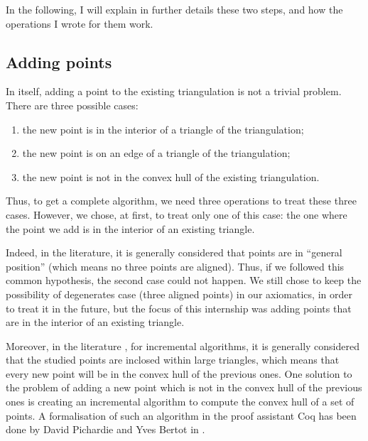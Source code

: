 \documentclass[a4paper,10pt]{article}
\begin{document}
In the following, I will explain in further details these two steps, and how the operations I wrote for them work.
\subsection{Adding points}
\label{step1}

In itself, adding a point to the existing triangulation is not a trivial problem.
There are three possible cases:
\begin{enumerate}
\item the new point is in the interior of a triangle of the triangulation;
\item the new point is on an edge of a triangle of the triangulation;
\item the new point is not in the convex hull of the existing triangulation.
\end{enumerate}
Thus, to get a complete algorithm, we need three operations to treat these three cases. However, we chose, at first, to treat only one of this case: the one where the point we add is in the interior of an existing triangle.

Indeed, in the literature, it is generally considered that points are in ``general position'' (which means no three points are aligned). Thus, if we followed this common hypothesis, the second case could not happen.
We still chose to keep the possibility of degenerates case (three aligned points) in our axiomatics, in order to treat it in the future, but the focus of this internship was adding points that are in the interior of an existing triangle.

Moreover, in the literature \cite{Del}, for incremental algorithms, it is generally considered that the studied points are inclosed within large triangles, which means that every new point will be in the convex hull of the previous ones. One solution to the problem of adding a new point which is not in the convex hull of the previous ones is creating an incremental algorithm to compute the convex hull of a set of points. A formalisation of such an algorithm in the proof assistant {\sc Coq} has been done by David Pichardie and Yves Bertot in \cite{Hull}.
\end{document}
